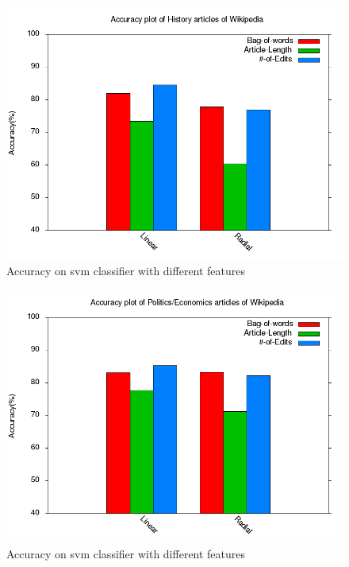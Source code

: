 \documentclass[twocolumn]{article}
\begin{document}
 

 \begin{figure}[t]
         \centering
         \includegraphics[width=0.95\columnwidth]{accuracy_plot.png}
         \caption{Accuracy on svm classifier with different features}
         \label{fig:block}
 \end{figure}
 \begin{figure}[Politics/Economics]
         \centering
         \includegraphics[width=0.95\columnwidth]{accuracy_plot2.png}
         \caption{Accuracy on svm classifier with different features}
         \label{fig:block}
 \end{figure}
\end{document}
